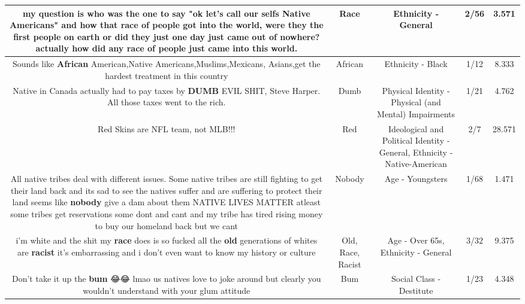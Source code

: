 \documentclass[11pt]{article}
\newlength\mylength
\begin{document}
\begin{center}
\begin{longtable}{|C{.65\mylength}|C{.30\mylength}|C{.12\mylength}|C{.12\mylength}|C{.12\mylength}|}
  \small my question is who was the one to say "ok let's call our selfs Native Americans" and how that \textbf{race} of people got into the world, were they the first people on earth or did they just one day just came out of nowhere? actually how did any \textbf{race} of people just came into this world.\normalsize   & Race & Ethnicity - General & 2/56 & 3.571 \\  \hline
  \small Sounds like \textbf{African} American,Native Americans,Muslims,Mexicans, Asians,get the hardest treatment in this country\normalsize   & African & Ethnicity - Black & 1/12 & 8.333 \\  \hline
  \small Native in Canada actually had to pay taxes by \textbf{DUMB} EVIL SHIT, Steve Harper. All those taxes went to the rich.\normalsize   & Dumb & Physical Identity - Physical (and Mental) Impairments & 1/21 & 4.762 \\  \hline
  \small Red Skins are NFL team, not MLB!!!\normalsize   & Red &  Ideological and Political Identity - General, Ethnicity - Native-American & 2/7 & 28.571 \\  \hline
  \small All native tribes deal with different issues. Some native tribes are still fighting to get their land back and its sad to see the natives suffer and are suffering to protect their land seems like \textbf{nobody} give a dam about them NATIVE LIVES MATTER  atleast some tribes get reservations some dont and cant and my tribe has tired rising money to buy our homeland back but we cant\normalsize   & Nobody & Age - Youngsters & 1/68 & 1.471 \\  \hline
  \small i'm white and the shit my \textbf{race} does is so fucked all the \textbf{old} generations of whites are \textbf{racist} it's embarrassing and i don't even want to know my history or culture\normalsize   & Old, Race, Racist & Age - Over 65s, Ethnicity - General & 3/32 & 9.375 \\  \hline
  \small Don't take it up the \textbf{bum} 😂😂 lmao us natives love to joke around but clearly you wouldn't understand with your glum attitude\normalsize   & Bum & Social Class - Destitute & 1/23 & 4.348 \\  \hline

\end{longtable}
\end{center}
\end{document}
